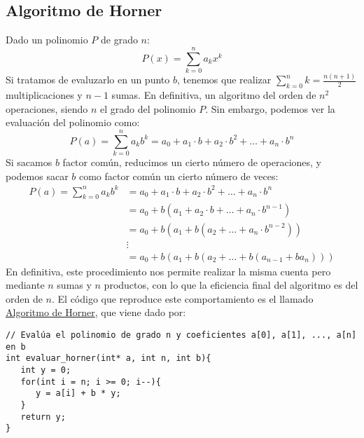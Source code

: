 \subsection{Algoritmo de Horner}
Dado un polinomio $P$ de grado $n$:
\begin{equation*}
    P(x) = \sum_{k=0}^{n} a_k x^k 
\end{equation*}
Si tratamos de evaluzarlo en un punto $b$, tenemos que realizar $\sum\limits_{k=0}^{n} k = \frac{n(n+1)}{2}$ multiplicaciones y $n-1$ sumas. En definitiva, un algoritmo del orden de $n^2$ operaciones, siendo $n$ el grado del polinomio $P$. Sin embargo, podemos ver la evaluación del polinomio como:
\begin{equation*}
    P(a) = \sum_{k=0}^{n} a_k b^k  = a_0 + a_1\cdot b + a_2\cdot b^2 + \ldots + a_n\cdot b^n
\end{equation*}
Si sacamos $b$ factor común, reducimos un cierto número de operaciones, y podemos sacar $b$ como factor común un cierto número de veces:
\begin{align*}
    P(a) = \sum_{k=0}^{n} a_k b^k  &= a_0 + a_1\cdot b + a_2\cdot b^2 + \ldots + a_n\cdot b^n \\
                                   &= a_0 + b(a_1 + a_2\cdot b + \ldots + a_n \cdot b^{n-1}) \\
                                   &= a_0 + b(a_1 + b(a_2 + \ldots + a_n \cdot b^{n-2})) \\
                                   &\vdots \\
                                   &= a_0 + b(a_1 + b(a_2 + \ldots + b(a_{n-1} + ba_n)))
\end{align*}
En definitiva, este procedimiento nos permite realizar la misma cuenta pero mediante $n$ sumas y $n$ productos, con lo que la eficiencia final del algoritmo es del orden de $n$. El código que reproduce este comportamiento es el llamado \underline{Algoritmo de Horner}, que viene dado por:
\begin{verbatim}
// Evalúa el polinomio de grado n y coeficientes a[0], a[1], ..., a[n] en b
int evaluar_horner(int* a, int n, int b){
   int y = 0;
   for(int i = n; i >= 0; i--){
      y = a[i] + b * y;
   }
   return y;
}
\end{verbatim}

